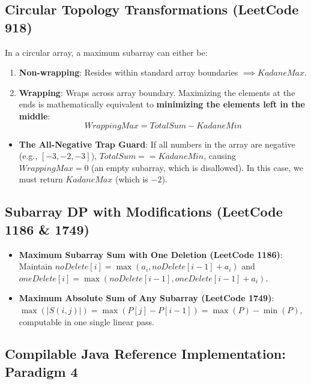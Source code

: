 \documentclass[10pt,journal,compsoc,onecolumn]{IEEEtran}
\begin{document}
\subsection{Circular Topology Transformations (LeetCode 918)}
In a circular array, a maximum subarray can either be:
\begin{enumerate}
    \item \textbf{Non-wrapping}: Resides within standard array boundaries $\implies KadaneMax$.
    \item \textbf{Wrapping}: Wraps across array boundary. Maximizing the elements at the ends is mathematically equivalent to \textbf{minimizing the elements left in the middle}:
    \begin{equation}
    WrappingMax = TotalSum - KadaneMin
    \end{equation}
\end{enumerate}
\begin{itemize}
    \item \textbf{The All-Negative Trap Guard}: If all numbers in the array are negative (e.g., $[-3, -2, -3]$), $TotalSum == KadaneMin$, causing $WrappingMax = 0$ (an empty subarray, which is disallowed). In this case, we must return $KadaneMax$ (which is $-2$).
\end{itemize}

\subsection{Subarray DP with Modifications (LeetCode 1186 \& 1749)}
\begin{itemize}
    \item \textbf{Maximum Subarray Sum with One Deletion (LeetCode 1186)}: Maintain $noDelete[i] = \max(a_i, noDelete[i-1] + a_i)$ and $oneDelete[i] = \max(noDelete[i-1], oneDelete[i-1] + a_i)$.
    \item \textbf{Maximum Absolute Sum of Any Subarray (LeetCode 1749)}: $\max(|S(i, j)|) = \max(P[j] - P[i-1]) = \max(P) - \min(P)$, computable in one single linear pass.
\end{itemize}

\subsection{Compilable Java Reference Implementation: Paradigm 4}
\end{document}
